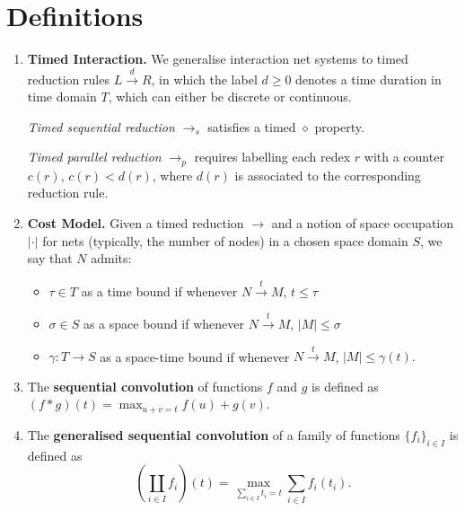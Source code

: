 \documentclass{fit-teorsem}
\begin{document}
\section*{Definitions}
\begin{enumerate}
\item \textbf{Timed Interaction.} We generalise interaction net systems to timed reduction rules
	$L \stackrel{d}{\longrightarrow} R$, in which the label $d \ge 0$ denotes a time duration
	in time domain $T$, which can either be discrete or continuous.

	\textit{Timed sequential reduction} $\longrightarrow_s$ satisfies a timed $\diamond$ property.

	\textit{Timed parallel reduction} $\longrightarrow_p$ requires labelling each redex $r$ with
	a counter $c(r)$, $c(r) < d(r)$, where $d(r)$ is associated to the corresponding reduction rule.

\item \textbf{Cost Model.} Given a timed reduction $\longrightarrow$ and a notion of space
	occupation $|\cdot|$ for nets (typically, the number of nodes) in a chosen
	space domain $S$, we say that $N$ admits:
	\begin{itemize}
		\item $\tau \in T$ as a time bound if whenever
			$N \stackrel{t}{\longrightarrow} M$, $t \le \tau$
		\item $\sigma \in S$ as a space bound if whenever
			$N \stackrel{t}{\longrightarrow} M$, $|M| \le \sigma$
		\item $\gamma : T \to S$ as a space-time bound if whenever
			$N \stackrel{t}{\longrightarrow} M$, $|M| \le \gamma(t).$
	\end{itemize}

\item The \textbf{sequential convolution} of functions $f$ and $g$ is defined as
	$(f \ast g)(t) = \max_{u + v = t} f(u) + g(v)$.

\item The \textbf{generalised sequential convolution} of a family of functions $\{f_i\}_{i \in I}$ is
	defined as \[
		\left(\coprod_{i \in I} f_i\right)(t) = \max_{\sum_{i \in I} t_i = t} \sum_{i \in I} f_i(t_i)
	.\]
\end{enumerate}
\end{document}
